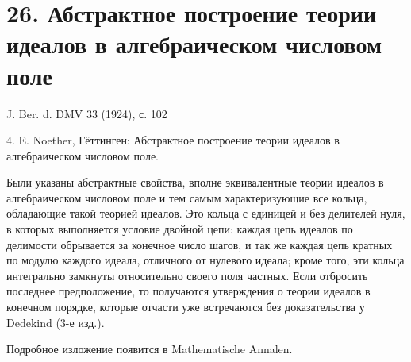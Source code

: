 \documentclass[11pt]{article}
\begin{document}
\section*{26. Абстрактное построение теории идеалов в алгебраическом числовом поле}

\begin{center}
J. Ber. d. DMV 33 (1924), с. 102
\end{center}

4. E. Noether, Гёттинген: Абстрактное построение теории идеалов в алгебраическом числовом поле.

Были указаны абстрактные свойства, вполне эквивалентные теории идеалов в алгебраическом числовом поле и тем самым характеризующие все кольца, обладающие такой теорией идеалов. Это кольца с единицей и без делителей нуля, в которых выполняется условие двойной цепи: каждая цепь идеалов по делимости обрывается за конечное число шагов, и так же каждая цепь кратных по модулю каждого идеала, отличного от нулевого идеала; кроме того, эти кольца интегрально замкнуты относительно своего поля частных. Если отбросить последнее предположение, то получаются утверждения о теории идеалов в конечном порядке, которые отчасти уже встречаются без доказательства у Dedekind (3-е изд.).

Подробное изложение появится в Mathematische Annalen.
\end{document}
